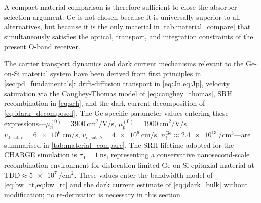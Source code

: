 A compact material comparison is therefore sufficient to close the absorber
selection argument: Ge is not chosen because it is universally superior to all
alternatives, but because it is the only material in \cref{tab:material_compare}
that simultaneously satisfies the optical, transport, and integration constraints
of the present O-band receiver.


The carrier transport dynamics and dark current mechanisms relevant to
the Ge-on-Si material system have been derived from first principles in
\cref{sec:pd_fundamentals}: drift-diffusion transport in
\cref{eq:Jn,eq:Jp}, velocity saturation via the Caughey-Thomas model of
\cref{eq:caughey_thomas}, SRH recombination in \cref{eq:srh}, and the
dark current decomposition of \cref{eq:idark_decomposed}. The Ge-specific
parameter values entering these expressions---$\mu_n^{(0)}=
\SI{3900}{\centi\metre\squared\per\volt\per\second}$,
$\mu_p^{(0)}=\SI{1900}{\centi\metre\squared\per\volt\per\second}$,
$v_{\mathrm{d,sat},e}=\SI{6e6}{\centi\metre\per\second}$,
$v_{\mathrm{d,sat},h}=\SI{4e6}{\centi\metre\per\second}$,
$n_i^{\mathrm{Ge}}\approx\SI{2.4e13}{\per\centi\metre\cubed}$---are
summarised in \cref{tab:material_compare}. The SRH lifetime adopted for
the CHARGE simulation is $\tau_0=\SI{1}{\nano\second}$, representing a
conservative nanosecond-scale recombination environment for
dislocation-limited Ge-on-Si epitaxial material at
TDD$\approx\SI{5e7}{\per\centi\metre\squared}$. These values enter
the bandwidth model of \cref{eq:bw_tt,eq:bw_rc} and the dark current
estimate of \cref{eq:jdark_bulk} without modification; no re-derivation
is necessary in this section.